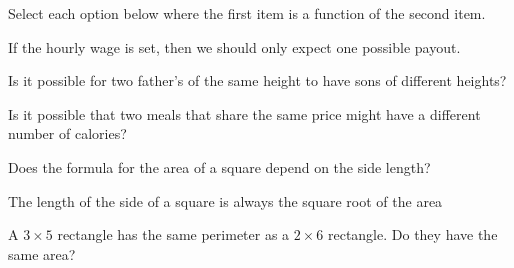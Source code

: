 \documentclass{ximera}
\begin{document}
\begin{question}
Select each option below where the first item is a function of the second item.
  \begin{solution}
    \begin{multiple-choice}
    \end{multiple-choice}
    \begin{hint}
    If the hourly wage is set, then we should only expect one possible payout.
    \end{hint}
    \begin{hint}
    Is it possible for two father's of the same height to have sons of different heights?
    \end{hint}
    \begin{hint}
    Is it possible that two meals that share the same price might have a different number of calories?
    \end{hint}
    \begin{hint}
    Does the formula for the area of a square depend on the side length?
    \end{hint}
    \begin{hint}
    The length of the side of a square is always the square root of the area
    \end{hint}
    \begin{hint}
    A $3\times 5$ rectangle has the same perimeter as a $2\times 6$ rectangle. Do they have the same area?
    \end{hint}
  \end{solution}
\end{question}
\end{document}
